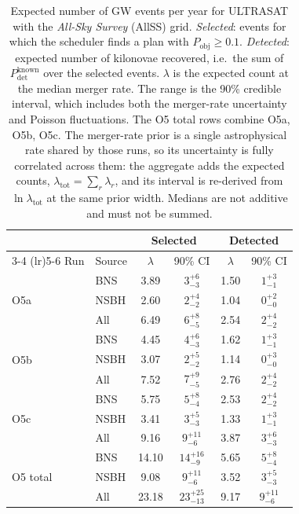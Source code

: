 \begin{table}[!htb]
\centering
\renewcommand\arraystretch{1.15}
\setlength{\tabcolsep}{0.22cm}
\caption{Expected number of GW events per year for ULTRASAT with the \emph{All-Sky Survey} (AllSS) grid. \emph{Selected}: events for which the scheduler finds a plan with $P_\mathrm{obj} \geq 0.1$. \emph{Detected}: expected number of kilonovae recovered, i.e.\ the sum of $P_\mathrm{det}^\mathrm{known}$ over the selected events. $\lambda$ is the expected count at the median merger rate. The range is the 90\% credible interval, which includes both the merger-rate uncertainty and Poisson fluctuations. The O5 total rows combine O5a, O5b, O5c. The merger-rate prior is a single astrophysical rate shared by those runs, so its uncertainty is fully correlated across them: the aggregate adds the expected counts, $\lambda_\mathrm{tot} = \sum_r \lambda_r$, and its interval is re-derived from $\ln \lambda_\mathrm{tot}$ at the same prior width. Medians are not additive and must not be summed.}
\label{tab:ultrasat-allsky-selected-detected-1yr}
\begin{tabular}{llcccc}
\toprule
 & & \multicolumn{2}{c}{Selected} & \multicolumn{2}{c}{Detected} \\
\cmidrule(lr){3-4} \cmidrule(lr){5-6}
Run & Source & $\lambda$ & 90\% CI & $\lambda$ & 90\% CI \\
\midrule
\multirow{3}{*}{O5a} & BNS  & 3.89 & $3^{+6}_{-3}$ & 1.50 & $1^{+3}_{-1}$ \\
                     & NSBH & 2.60 & $2^{+4}_{-2}$ & 1.04 & $0^{+2}_{-0}$ \\
                     & All  & 6.49 & $6^{+8}_{-5}$ & 2.54 & $2^{+4}_{-2}$ \\
\midrule
\multirow{3}{*}{O5b} & BNS  & 4.45 & $4^{+6}_{-3}$ & 1.62 & $1^{+3}_{-1}$ \\
                     & NSBH & 3.07 & $2^{+5}_{-2}$ & 1.14 & $0^{+3}_{-0}$ \\
                     & All  & 7.52 & $7^{+9}_{-5}$ & 2.76 & $2^{+4}_{-2}$ \\
\midrule
\multirow{3}{*}{O5c} & BNS  & 5.75 & $5^{+8}_{-4}$ & 2.53 & $2^{+4}_{-2}$ \\
                     & NSBH & 3.41 & $3^{+5}_{-3}$ & 1.33 & $1^{+3}_{-1}$ \\
                     & All  & 9.16 & $9^{+11}_{-6}$ & 3.87 & $3^{+6}_{-3}$ \\
\midrule
\multirow{3}{*}{O5 total} & BNS  & 14.10 & $14^{+16}_{-9}$ & 5.65 & $5^{+8}_{-4}$ \\
                          & NSBH & 9.08 & $9^{+11}_{-6}$ & 3.52 & $3^{+5}_{-3}$ \\
                          & All  & 23.18 & $23^{+25}_{-13}$ & 9.17 & $9^{+11}_{-6}$ \\
\bottomrule
\end{tabular}
\end{table}
